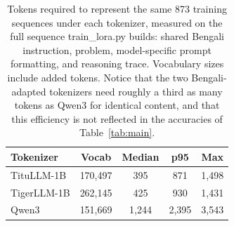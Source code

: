 \begin{table}[htbp]
\caption{Tokens required to represent the same 873 training sequences
under each tokenizer, measured on the full sequence train\_lora.py
builds: shared Bengali instruction, problem, model-specific prompt
formatting, and reasoning trace. Vocabulary sizes include added tokens.
Notice that the two Bengali-adapted tokenizers need roughly a third as
many tokens as Qwen3 for identical content, and that this efficiency is
not reflected in the accuracies of Table~\ref{tab:main}.}
\label{tab:tokenizer}
\centering
\begin{tabular}{|l|c|c|c|c|}
\hline
\textbf{Tokenizer} & \textbf{Vocab} & \textbf{Median} & \textbf{p95} & \textbf{Max} \\
\hline
TituLLM-1B & 170,497 & 395 & 871 & 1,498 \\
TigerLLM-1B & 262,145 & 425 & 930 & 1,431 \\
Qwen3 & 151,669 & 1,244 & 2,395 & 3,543 \\
\hline
\end{tabular}
\end{table}